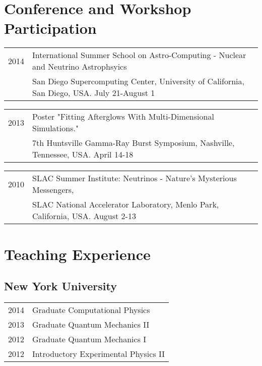 \documentclass[letterpaper]{article}
\renewenvironment{itemize}{
  \begin{list}{}{
    \setlength{\leftmargin}{1.5em}
  }
}{
  \end{list}
}
\begin{document}
\section*{Conference and Workshop Participation}
\begin{itemize}
\item \begin{tabular}{ll}
2014 & International Summer School on Astro-Computing - Nuclear and Neutrino Astrophsyics \\ 
	& San Diego Supercomputing Center, University of California, San Diego, USA. July 21-August 1
\end{tabular}

\item \begin{tabular}{ll}
2013 & Poster "Fitting Afterglows With Multi-Dimensional Simulations." \\ 
	&7th Huntsville Gamma-Ray Burst Symposium, Nashville, Tennessee, USA.  April 14-18 \\
\end{tabular}

\item \begin{tabular}{ll}
2010 & SLAC Summer Institute: Neutrinos - Nature's Mysterious Messengers, \\ 
	 & SLAC National Accelerator Laboratory, Menlo Park, California, USA.  August 2-13\\
\end{tabular}
\end{itemize}



\section*{Teaching Experience}
\subsection*{New York University}
\begin{itemize}
\item \begin{tabular}{ll}
2014 & Graduate Computational Physics \\
2013 & Graduate Quantum Mechanics II \\
2012 & Graduate Quantum Mechanics I \\
2012 & Introductory Experimental Physics II \\
\end{tabular}
\end{itemize}
\end{document}
